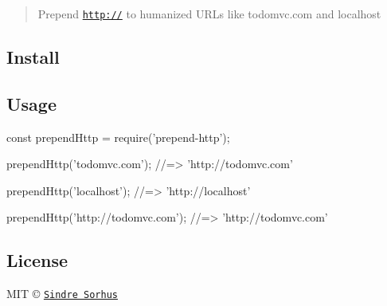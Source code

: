 \begin{quote}
Prepend {\ttfamily \href{http://}{\tt http\+://}} to humanized U\+R\+Ls like {\ttfamily todomvc.\+com} and {\ttfamily localhost} \end{quote}


\subsection*{Install}




\subsection*{Usage}


\begin{DoxyCode}
const prependHttp = require('prepend-http');

prependHttp('todomvc.com');
//=> 'http://todomvc.com'

prependHttp('localhost');
//=> 'http://localhost'

prependHttp('http://todomvc.com');
//=> 'http://todomvc.com'
\end{DoxyCode}


\subsection*{License}

M\+IT © \href{https://sindresorhus.com}{\tt Sindre Sorhus} 